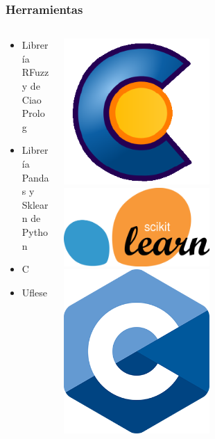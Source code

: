 \documentclass{beamer}
\newcommand{\slideauthor}[1]{\gdef\insertslideauthor{#1}}
\newcommand{\insertslideauthor}{}
\begin{document}
\begin{frame}
\frametitle{Herramientas}
\slideauthor{Diego Fogued}
\begin{columns}
    \begin{column}{0.7\textwidth}
        \begin{itemize}
            \item Librería RFuzzy de Ciao Prolog
            \vspace{0.25cm}
            \item Librería Pandas y Sklearn de Python
            \vspace{0.25cm}
            \item C
            \vspace{0.5cm}
            \item Uflese
        \end{itemize}
    \end{column}
    \begin{column}{0.3\textwidth}
        \includegraphics[width=0.5\textwidth]{Images/ciao.png}
        \vspace{0.25cm}
        \includegraphics[width=0.5\textwidth]{Images/Sklearn.jpg}
        \vspace{0.25cm}
        \includegraphics[width=0.5\textwidth]{Images/C_Logo.png}
    \end{column}
\end{columns}
\end{frame}
\end{document}
